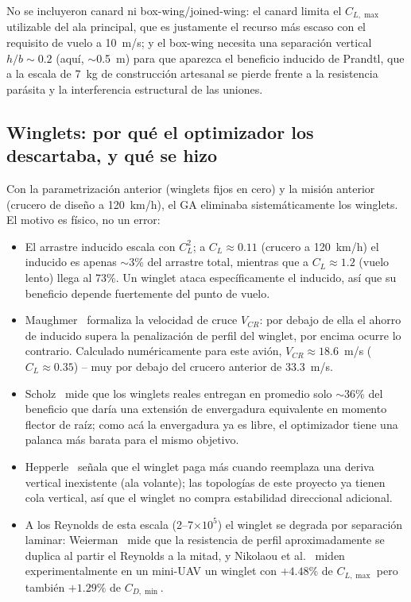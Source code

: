 \documentclass[11pt,a4paper]{article}
\begin{document}
No se incluyeron canard ni box-wing/joined-wing: el canard limita el $C_{L,\max}$ utilizable del ala principal, que es justamente el recurso más escaso con el requisito de vuelo a 10~m/s; y el box-wing necesita una separación vertical $h/b \sim 0.2$ (aquí, $\sim$0.5~m) para que aparezca el beneficio inducido de Prandtl, que a la escala de 7~kg de construcción artesanal se pierde frente a la resistencia parásita y la interferencia estructural de las uniones.

\subsection{Winglets: por qué el optimizador los descartaba, y qué se hizo}

Con la parametrización anterior (winglets fijos en cero) y la misión anterior (crucero de diseño a 120~km/h), el GA eliminaba sistemáticamente los winglets. El motivo es físico, no un error:

\begin{itemize}[nosep]
  \item El arrastre inducido escala con $C_L^2$; a $C_L \approx 0.11$ (crucero a 120~km/h) el inducido es apenas $\sim$3\% del arrastre total, mientras que a $C_L\approx 1.2$ (vuelo lento) llega al 73\%. Un winglet ataca específicamente el inducido, así que su beneficio depende fuertemente del punto de vuelo.
  \item Maughmer~\cite{maughmer2003} formaliza la velocidad de cruce $V_{CR}$: por debajo de ella el ahorro de inducido supera la penalización de perfil del winglet, por encima ocurre lo contrario. Calculado numéricamente para este avión, $V_{CR}\approx 18.6$~m/s ($C_L\approx0.35$) -- muy por debajo del crucero anterior de 33.3~m/s.
  \item Scholz~\cite{scholz2018} mide que los winglets reales entregan en promedio solo $\sim$36\% del beneficio que daría una extensión de envergadura equivalente en momento flector de raíz; como acá la envergadura ya es libre, el optimizador tiene una palanca más barata para el mismo objetivo.
  \item Hepperle~\cite{hepperle} señala que el winglet paga más cuando reemplaza una deriva vertical inexistente (ala volante); las topologías de este proyecto ya tienen cola vertical, así que el winglet no compra estabilidad direccional adicional.
  \item A los Reynolds de esta escala (2--7$\times10^5$) el winglet se degrada por separación laminar: Weierman~\cite{weierman2010} mide que la resistencia de perfil aproximadamente se duplica al partir el Reynolds a la mitad, y Nikolaou et al.~\cite{nikolaou2025} miden experimentalmente en un mini-UAV un winglet con $+4.48\%$ de $C_{L,\max}$ pero también $+1.29\%$ de $C_{D,\min}$.
\end{itemize}
\end{document}
